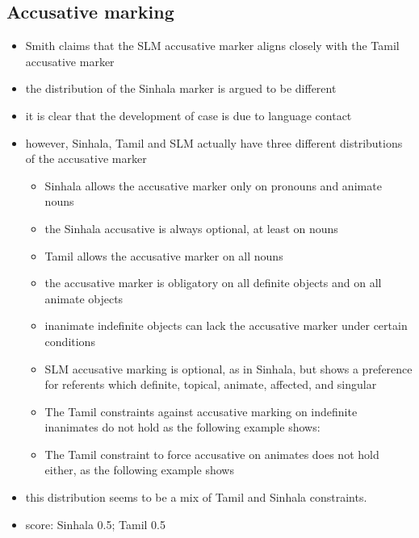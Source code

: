 \documentclass[a4paper,12pt]{article}
\begin{document}
\subsection{Accusative marking}
\begin{itemize}
 \item Smith claims that the SLM accusative marker aligns closely with the Tamil accusative marker
 \item the distribution of the Sinhala marker is argued to be different
 \item it is clear that the development of case is due to language contact
 \item however, Sinhala, Tamil and SLM actually have three different distributions of the accusative marker
\begin{itemize}
 \item Sinhala allows the accusative marker only on pronouns and animate nouns
 \item the Sinhala accusative is always optional, at least on nouns \citep[780]{Gair2003}
 \item Tamil allows the accusative marker on all nouns
 \item the accusative marker is obligatory on all definite objects and on all animate objects \citep[27]{Lehmann1989tamil}
 \item inanimate indefinite objects can lack the accusative marker under certain conditions \citep[27f]{Lehmann1989tamil}
 \item SLM accusative marking is optional, as in Sinhala, but shows a preference for referents which definite, topical, animate, affected, and singular \citep[329-332]{Nordhoff2009phd}
 \item The Tamil constraints against accusative marking on indefinite inanimates do not hold as the following example shows:



 \item The Tamil constraint to force accusative on animates does not hold either, as the following example shows 



\end{itemize}
 \item this distribution seems to be a mix of Tamil and Sinhala constraints.
 \item score: Sinhala 0.5; Tamil 0.5
\end{itemize}
\end{document}
